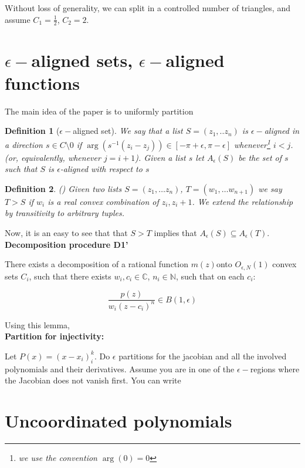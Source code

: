 \documentclass{article}
\newtheorem{defi}{Definition}
\begin{document}
Without loss of generality, we can split in a controlled number of triangles, and assume $C_1 = \frac 1 2$, $C_2=2$. 


\section{$\epsilon-$aligned sets, $\epsilon-$aligned functions} %
\label{sec:section_name}

The main idea of the paper is to uniformly partition 

\begin{defi}[$\epsilon-$aligned set] We say that a list $S = (z_1, .. z_n)$ is $\epsilon-$aligned in a direction $s \in C\setminus 0$ if $\arg{(s^{-1}(z_i-z_j))} \in [-\pi +\epsilon,\pi -\epsilon]$ whenever\footnote{we use the convention $\arg(0) = 0$} $i<j$. (or, equivalently, whenever $j=i+1$). Given a list $s$ let $A_\epsilon(S)$ be the set of $s$ such that $S$ is $\epsilon$-aligned with respect to $s$
\end{defi}

\begin{defi} ()
	Given two lists $S = (z_1, \dots z_n)$, $T=(w_1, \dots w_{n+1})$ we say $T> S$ if $w_i$ is a real convex combination of $z_i,z_i+1$. We extend the relationship by transitivity to arbitrary tuples. 
\end{defi}

Now, it is an easy to see that that $S>T$ implies that $A_\epsilon(S) \subseteq A_\epsilon(T)$.\\

\textbf{Decomposition procedure D1'}

There exists a decomposition of a rational function $m(z)$onto $O_{\epsilon, N}(1)$ convex sets $C_i$, such that there exists $w_i, c_i \in \mathbb C$, $n_i \in \mathbb N$, such that on each $c_i$:

\begin{equation}
	\frac{p(z)}{w_i(z-c_i)^n} \in B(1,\epsilon)
\end{equation}

Using this lemma, \\


\textbf{Partition for injectivity:}

Let $P(x) = (x-x_i)^k_i$. Do $\epsilon$ partitions for the jacobian and all the involved polynomials and their derivatives. Assume you are in one of the $\epsilon-$regions where the Jacobian does not vanish first. You can write 

\section{Uncoordinated polynomials} %
\label{sec:uncoordinated_polynomials}
\end{document}
